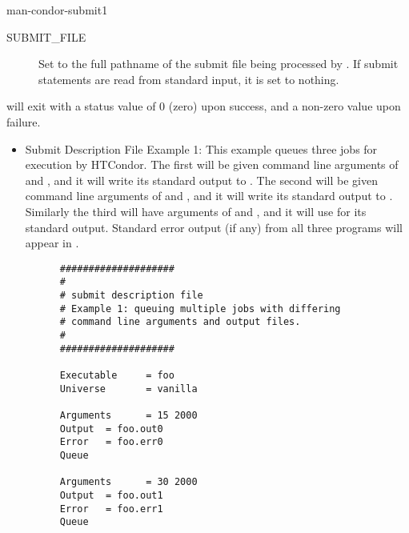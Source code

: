 \begin{ManPage}{}{man-condor-submit}{1}
\begin{description}
\item[SUBMIT\_FILE]
Set to the full pathname of the submit file being processed by . If submit statements
are read from standard input, it is set to nothing.
\end{description}

\ExitStatus

 will exit with a status value of 0 (zero) upon success, and a
non-zero value upon failure.

\label{condor-submit-examples}
\Examples

\begin{itemize} 
\item{Submit Description File Example 1:} This example queues three jobs for
execution by HTCondor. The first will be given command line arguments of
 and , and it will write its standard output
to .
The second will be given command line arguments of 
 and , and it will
write its standard output to .
Similarly the third will have
arguments of 
 and , and it will use  for its standard
output. Standard error output (if any) from all three programs will
appear in .

\footnotesize
\begin{verbatim}
      ####################
      #
      # submit description file
      # Example 1: queuing multiple jobs with differing
      # command line arguments and output files.
      #                                                                      
      ####################                                                   
                                                                         
      Executable     = foo                                                   
      Universe       = vanilla
                                                                         
      Arguments      = 15 2000                                               
      Output  = foo.out0                                                     
      Error   = foo.err0
      Queue                                                                  
                                                                         
      Arguments      = 30 2000                                               
      Output  = foo.out1                                                     
      Error   = foo.err1
      Queue                                                                  
                                                                         

\end{verbatim}
\end{itemize}
\end{ManPage}

